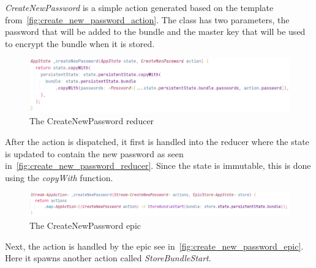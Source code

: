 \documentclass[a4paper,12pt]{report}
\begin{document}
\textit{CreateNewPassword} is a simple action generated based on the template
from~\autoref{fig:create_new_password_action}. The class has two parameters, the
password that will be added to the bundle and the master key that will be used
to encrypt the bundle when it is stored.

\begin{figure}[H]
    \centering
    \includegraphics[scale=0.6]{images/code/create_new_password_reducer.png}
    \caption{The CreateNewPassword reducer}\label{fig:create_new_password_reducer}
\end{figure}

After the action is dispatched, it first is handled into the reducer where the
state is updated to contain the new password as seen
in~\autoref{fig:create_new_password_reducer}. Since the state is immutable,
this is done using the \textit{copyWith} function.

\begin{figure}[H]
    \centering
    \includegraphics[scale=0.6]{images/code/create_new_password_epic.png}
    \caption{The CreateNewPassword epic}\label{fig:create_new_password_epic}
\end{figure}

Next, the action is handled by the epic see
in~\autoref{fig:create_new_password_epic}. Here it spawns another action called
\textit{StoreBundleStart}.
\end{document}
